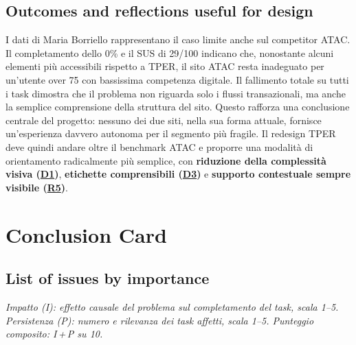 \documentclass[11pt,a4paper]{article}
\begin{document}
\subsection*{Outcomes and reflections useful for design}
\begin{tcolorbox}[colback=backgroundColor,colframe=borderColor,arc=2mm]
I dati di Maria Borriello rappresentano il caso limite anche sul competitor ATAC. Il completamento dello 0\% e il SUS di 29/100 indicano che, nonostante alcuni elementi più accessibili rispetto a TPER, il sito ATAC resta inadeguato per un'utente over 75 con bassissima competenza digitale. Il fallimento totale su tutti i task dimostra che il problema non riguarda solo i flussi transazionali, ma anche la semplice comprensione della struttura del sito. Questo rafforza una conclusione centrale del progetto: nessuno dei due siti, nella sua forma attuale, fornisce un'esperienza davvero autonoma per il segmento più fragile. Il redesign TPER deve quindi andare oltre il benchmark ATAC e proporre una modalità di orientamento radicalmente più semplice, con \textbf{riduzione della complessità visiva (\hyperref[atac:D1]{D1})}, \textbf{etichette comprensibili (\hyperref[atac:D3]{D3})} e \textbf{supporto contestuale sempre visibile (\hyperref[atac:R5]{R5})}.
\end{tcolorbox}



\newpage

\section{Conclusion Card}

\subsection*{List of issues by importance}

\noindent\textit{Impatto (I): effetto causale del problema sul completamento 
del task, scala 1--5. Persistenza (P): numero e rilevanza dei task affetti, 
scala 1--5. Punteggio composito: I\,+\,P su 10.}
\end{document}

